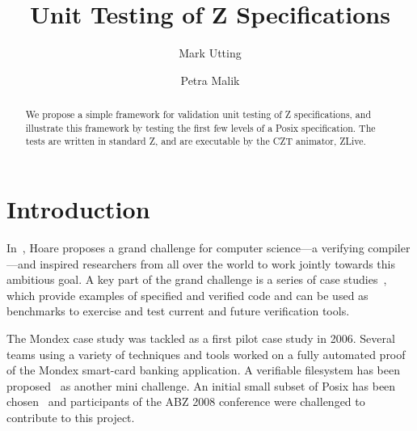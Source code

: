 \documentclass{llncs}
\begin{document}
\pagestyle{headings}  %
%
\title{Unit Testing of Z Specifications}
%
\author{Mark Utting \and Petra Malik}
%
%
%

\maketitle              %

\begin{abstract}
  We propose a simple framework for validation unit testing of Z
  specifications, and illustrate this framework by testing the first few
  levels of a Posix specification.  The tests are written in standard Z,
  and are executable by the CZT animator, ZLive.
\end{abstract}

\section{Introduction}

In~\cite{Hoa03}, Hoare proposes a grand challenge for computer
science---a verifying compiler---and inspired researchers from all
over the world to work jointly towards this ambitious goal.  
A key part of the grand challenge is a series of case 
studies~\cite{BicHoaWoo06}, which
provide examples of specified and verified code and can
be used as benchmarks to exercise and test current and future
verification tools.

The Mondex case study was tackled as a first pilot case study in 2006.
Several teams using a variety of techniques and tools worked on
a fully automated proof of the Mondex smart-card banking application.
A verifiable filesystem has been proposed~\cite{JosHol07} as another
mini challenge.  An initial small subset of Posix has been
chosen~\cite{FreFuWoo07} and participants of the ABZ 2008 conference
were challenged to contribute to this project.
\end{document}
